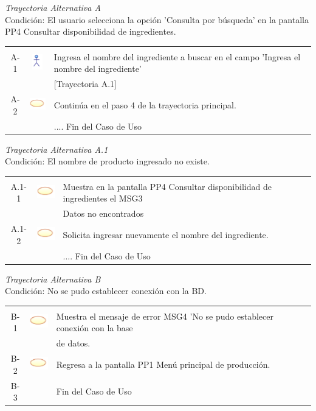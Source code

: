 \documentclass[10pt,spanish]{article}
\providecommand{\tabularnewline}{\\}
\begin{document}
	\textit{Trayectoria Alternativa A}\\
	Condición: El usuario selecciona la opción 'Consulta por búsqueda' en la pantalla PP4 Consultar disponibilidad de ingredientes.\\
	\begin{tabular}{ccl}
	& & \tabularnewline
	A-1 & \includegraphics{actor} & Ingresa el nombre del ingrediente a buscar en el campo 'Ingresa el nombre del ingrediente'\tabularnewline
	& & [Trayectoria A.1]\tabularnewline
	A-2 & \includegraphics{sistema} & Continúa en el paso 4 de la trayectoria principal.\tabularnewline	
	 & & .... Fin del Caso de Uso\tabularnewline
	\end{tabular}
	
	\textit{Trayectoria Alternativa A.1}\\
	Condición: El nombre de producto ingresado no existe.\\
	\begin{tabular}{ccl}
	& & \tabularnewline
	A.1-1 & \includegraphics{sistema} & Muestra en la pantalla PP4 Consultar disponibilidad de ingredientes el MSG3\tabularnewline
	& &  Datos no encontrados\tabularnewline 
	A.1-2 & \includegraphics{sistema} & Solicita ingresar nuevamente el nombre del ingrediente.\tabularnewline	
	 & & .... Fin del Caso de Uso\tabularnewline
	\end{tabular}
	
	\textit{Trayectoria Alternativa B}\\
	Condición: No se pudo establecer conexión con la BD.\\
	\begin{tabular}{ccl}
	& & \tabularnewline
	B-1 & \includegraphics{sistema} & Muestra el mensaje de error MSG4 'No se pudo establecer conexión con la base\tabularnewline
	& & de datos.\tabularnewline
	B-2 & \includegraphics{sistema} & Regresa a la pantalla PP1 Menú principal de producción.\tabularnewline
	B-3 & & Fin del Caso de Uso\tabularnewline	
	\end{tabular}
	
\end{document}

